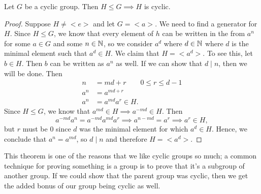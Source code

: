 \begin{theorem}{}\label{thm:cyclic_subgroup}
	Let $G$ be a cyclic group. Then $H\leq G\implies H$ is cyclic.
\end{theorem}
\begin{proof}
	Suppose $H\neq <e>$ and let $G=<a>$. We need to find a generator for $H$. Since $H\leq G$, we know that every element of $h$ can be written in the from $a^{n}$ for some $a\in G$ and some $n\in\mathbb{N}$, so we consider $a^{d}$ where $d\in\mathbb{N}$ where $d$ is the minimal element such that $a^{d}\in H$.
	We claim that $H=<a^{d}>$. To see this, let $b\in H$. Then $b$ can be written as $a^{n}$ as well. If we can show that $d\mid n$, then we will be done. Then
	\begin{align*}
		n     & = md+r\qquad 0\leq r\leq d-1 \\
		a^{n} & = a^{md+r}                   \\
		a^{n} & = a^{md}a^{r}\in H.
	\end{align*}
	Since $H\leq G$, we know that $a^{md}\in H\implies a^{-md}\in H$. Then
	\[
		a^{-md}a^{n}=a^{-md}a^{md}a^{r}\implies
		a^{n-md}=a^{r}\implies
		a^{r}\in H,
	\]
	but $r$ must be 0 since $d$ was the minimal element for which $a^{d}\in H$. Hence, we conclude that $a^{n}=a^{md}$, so $d\mid n$ and therefore $H=<a^{d}>$.
\end{proof}

This theorem is one of the reasons that we like cyclic groups so much; a common technique for proving something is a group is to prove that it's a subgroup of another group. If we could show that the parent group was cyclic, then we get the added bonus of our group being cyclic as well.

